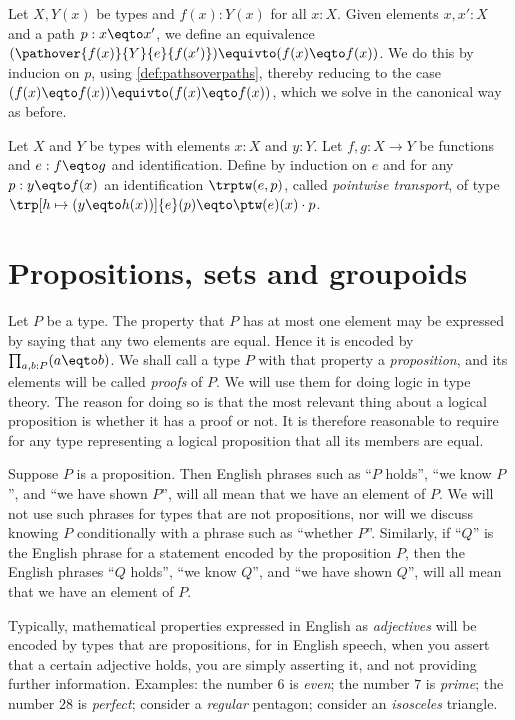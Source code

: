 \begin{definition}\label{def:Dan's-lemma}
Let $X,Y(x)$ be types and $f(x): Y(x)$ for all $x:X$.
Given elements $x,x':X$ and a path $p : x \eqto x'$, we define an equivalence
$(\pathover{f(x)}{Y}{e}{f(x')}) \equivto (f(x) \eqto f(x))$.
We do this by inducion on $p$, using \cref{def:pathsoverpaths},
thereby reducing to the case $(f(x) \eqto f(x)) \equivto (f(x) \eqto f(x))$,
which we solve in the canonical way as before.
\end{definition}

\begin{xca}\label{xca:trp-in-y=_(x)}
Let $X$ and $Y$ be types with elements $x:X$ and $y:Y$. 
Let $f,g: X\to Y$ be functions and $e: f\eqto g$ and identification.
Define by induction on $e$ and for any $p:y\eqto f(x)$ an identification 
$\trptw(e,p)$, called \emph{pointwise transport}, of type 
$\trp[h\mapsto (y\eqto h(x))]{e}(p) \eqto \ptw(e)(x)\cdot p$. 
\end{xca}


\section{Propositions, sets and groupoids}
\label{sec:props-sets-grpds}

Let $P$ be a type.  The property that $P$ has at most one element may
be expressed by saying that any two elements are equal.
Hence it is encoded by $\prod_{a,b:P} (a \eqto b)$.
We shall call a type $P$ with that property a \emph{proposition},%
and its elements will be called \emph{proofs} of $P$.%
We will use them for doing logic in type theory.
The reason for doing so is that the most relevant
thing about a logical proposition is whether it has a proof or not.
It is therefore reasonable to require for any type representing
a logical proposition that all its members are equal.

Suppose $P$ is a proposition.  Then English phrases such as ``$P$ holds'', ``we know $P$'', and ``we have shown $P$'', will all mean that we
have an element of $P$.  We will not use such phrases for types that are not propositions, nor will we discuss knowing $P$ conditionally with a
phrase such as ``whether $P$''.  Similarly, if ``$Q$'' is the English phrase for a statement encoded by the proposition $P$, then the English
phrases ``$Q$ holds'', ``we know $Q$'', and ``we have shown $Q$'', will all mean that we have an element of $P$.

Typically, mathematical properties expressed in English as \emph{adjectives} will be encoded by types that are propositions, for in English
speech, when you assert that a certain adjective holds, you are simply asserting it, and not providing further information.  Examples: the
number $6$ is \emph{even}; the number $7$ is \emph{prime}; the number $28$ is \emph{perfect}; consider a \emph{regular} pentagon; consider an
\emph{isosceles} triangle.

